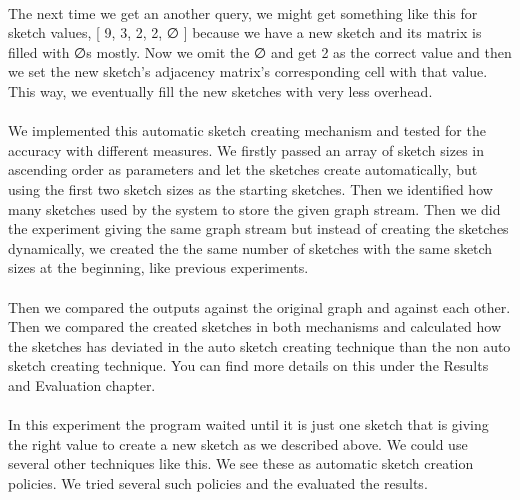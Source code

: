 \documentclass[12pt]{report}
\numberwithin{figure}{section}
\numberwithin{table}{section}
\begin{document}
\paragraph{}

The next time we get an another query, we might get something like this for sketch values, [ 9, 3, 2, 2, ∅ ] because we have a new sketch and its matrix is filled with ∅s mostly. Now we omit the ∅ and get 2 as the correct value and then we set the new sketch’s adjacency matrix’s corresponding cell with that value. This way, we eventually fill the new sketches with very less overhead.  

\paragraph{}

We implemented this automatic sketch creating mechanism and tested for the accuracy with different measures. We firstly passed an array of sketch sizes in ascending order as parameters and let the sketches create automatically, but using the first two sketch sizes as the starting sketches. Then we identified how many sketches used by the system to store the given graph stream. Then we did the experiment giving the same graph stream but instead of creating the sketches dynamically, we created the the same number of sketches with the same sketch sizes at the beginning, like previous experiments.

\paragraph{}

Then we compared the outputs against the original graph and against each other. Then we compared the created sketches in both mechanisms and calculated how the sketches has deviated in the auto sketch creating technique  than the non auto sketch creating technique. You can find more details on this under the Results and Evaluation chapter. 

\paragraph{}

In this experiment the program waited until it is just one sketch that is giving the right value to create a new sketch as we described above. We could use several other techniques like this. We see these as automatic sketch creation policies. We tried several such policies and the evaluated the results. 
\end{document}

